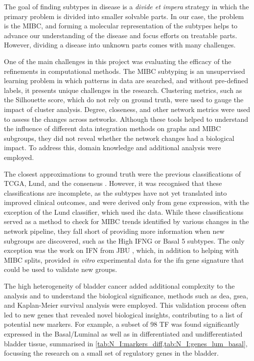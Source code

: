 The goal of finding subtypes in disease is a \textit{divide et impera} strategy in which the primary problem is divided into smaller solvable parts. In our case, the problem is the MIBC, and forming a molecular representation of the subtypes helps to advance our understanding of the disease and focus efforts on treatable parts. However, dividing a disease into unknown parts comes with many challenges. 

One of the main challenges in this project was evaluating the efficacy of the refinements in computational methods. The MIBC subtyping is an unsupervised learning problem in which patterns in data are searched, and without pre-defined labels, it presents unique challenges in the research. Clustering metrics, such as the Silhouette score, which do not rely on ground truth, were used to gauge the impact of cluster analysis. Degree, closeness, and other network metrics were used to assess the changes across networks. Although these tools helped to understand the influence of different data integration methods on graphs and MIBC subgroups, they did not reveal whether the network changes had a biological impact. To address this, domain knowledge and additional analysis were employed.

The closest approximations to ground truth were the previous classifications of TCGA, Lund, and the consensus \citep{Robertson2017-mg, Marzouka2018-ge, Kamoun2020-tj}. However, it was recognised that these classifications are incomplete, as the subtypes have not yet translated into improved clinical outcomes, and were derived only from gene expression, with the exception of the Lund classifier, which used \acrlong{ihc} data. While these classifications served as a method to check for MIBC trends identified by various changes in the network pipeline, they fall short of providing more information when new subgroups are discovered, such as the High IFNG or Basal 5 subtypes. The only exception was the work on \gls{IFN} from JBU \citep{Baker2022-bj}, which, in addition to helping with MIBC splits, provided \textit{in vitro} experimental data for the \acrshort{ifn} gene signature that could be used to validate new groups.

The high heterogeneity of bladder cancer added additional complexity to the analysis and to understand the biological significance, methods such as \acrlong{dea}, \acrlong{gsea}, and Kaplan-Meier survival analysis were employed. This validation process often led to new genes that revealed novel biological insights, contributing to a list of potential new markers. For example, a subset of 98 TF was found significantly expressed in the Basal/Luminal as well as in differentiated and undifferentiated bladder tissue, summarised in \cref{tab:N_I:markers_diff,tab:N_I:genes_lum_basal}, focussing the research on a small set of regulatory genes in the bladder.


